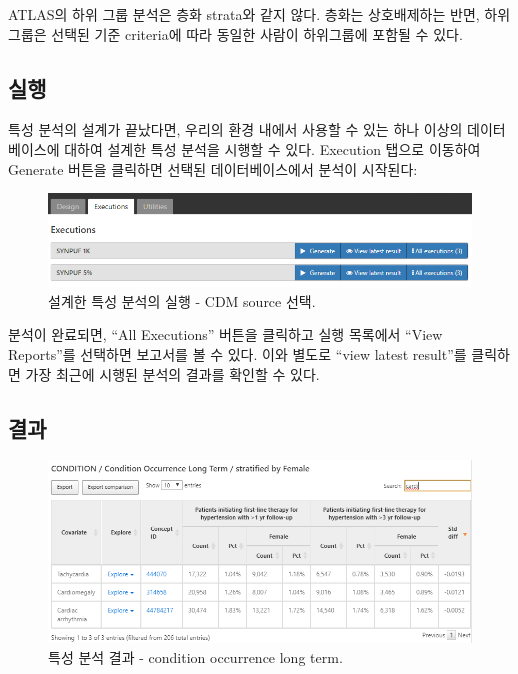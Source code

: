 \documentclass[10.5pt]{book}
\theoremstyle{definition}
\theoremstyle{definition}
\theoremstyle{definition}
\theoremstyle{remark}
\let\BeginKnitrBlock\begin \let\EndKnitrBlock\end
\begin{document}
\BeginKnitrBlock{rmdimportant}
ATLAS의 하위 그룹 분석은 층화 strata와 같지 않다. 층화는 상호배제하는
반면, 하위그룹은 선택된 기준 criteria에 따라 동일한 사람이 하위그룹에
포함될 수 있다.
\EndKnitrBlock{rmdimportant}

\subsection{실행}

특성 분석의 설계가 끝났다면, 우리의 환경 내에서 사용할 수 있는 하나
이상의 데이터베이스에 대하여 설계한 특성 분석을 시행할 수 있다.
Execution 탭으로 이동하여 Generate 버튼을 클릭하면 선택된
데이터베이스에서 분석이 시작된다:

\begin{figure}

{\centering \includegraphics[width=1\linewidth]{images/Characterization/atlasCharacterizationExecutions} 

}

\caption{설계한 특성 분석의 실행 - CDM source 선택.}\label{fig:atlasCharacterizationExecutions}
\end{figure}

분석이 완료되면, ``All Executions'' 버튼을 클릭하고 실행 목록에서 ``View
Reports''를 선택하면 보고서를 볼 수 있다. 이와 별도로 ``view latest
result''를 클릭하면 가장 최근에 시행된 분석의 결과를 확인할 수 있다.

\subsection{결과}\label{-1}

\begin{figure}

{\centering \includegraphics[width=1\linewidth]{images/Characterization/atlasCharacterizationResultsSummary} 

}

\caption{특성 분석 결과 - condition occurrence long term.}\label{fig:atlasCharacterizationResultsSummary}
\end{figure}
\end{document}
